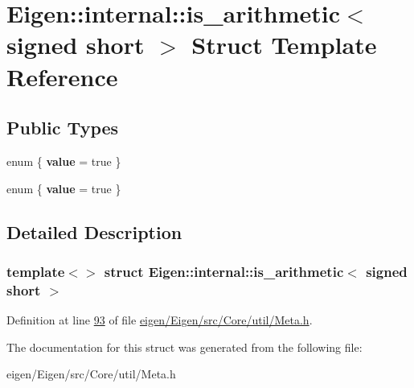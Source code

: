 \hypertarget{struct_eigen_1_1internal_1_1is__arithmetic_3_01signed_01short_01_4}{}\section{Eigen\+:\+:internal\+:\+:is\+\_\+arithmetic$<$ signed short $>$ Struct Template Reference}
\label{struct_eigen_1_1internal_1_1is__arithmetic_3_01signed_01short_01_4}
\subsection*{Public Types}
\begin{DoxyCompactItemize}
\item 
\mbox{\label{struct_eigen_1_1internal_1_1is__arithmetic_3_01signed_01short_01_4_a43b8b735f1aeb05decb52c410bd192f7}} 
enum \{ {\bfseries value} = true
 \}
\item 
\mbox{\label{struct_eigen_1_1internal_1_1is__arithmetic_3_01signed_01short_01_4_a37fd95b95215c898e8002c102feb5ca2}} 
enum \{ {\bfseries value} = true
 \}
\end{DoxyCompactItemize}


\subsection{Detailed Description}
\subsubsection*{template$<$$>$\newline
struct Eigen\+::internal\+::is\+\_\+arithmetic$<$ signed short $>$}



Definition at line \hyperlink{eigen_2_eigen_2src_2_core_2util_2_meta_8h_source_l00093}{93} of file \hyperlink{eigen_2_eigen_2src_2_core_2util_2_meta_8h_source}{eigen/\+Eigen/src/\+Core/util/\+Meta.\+h}.



The documentation for this struct was generated from the following file\+:\begin{DoxyCompactItemize}
\item 
eigen/\+Eigen/src/\+Core/util/\+Meta.\+h\end{DoxyCompactItemize}
